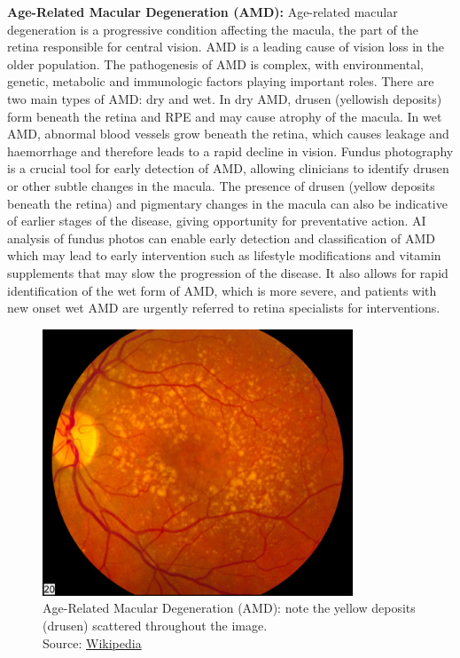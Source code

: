 \documentclass[
  Letterpaper,
]{scrbook}
\begin{document}
\textbf{Age-Related Macular Degeneration (AMD):} Age-related macular
degeneration is a progressive condition affecting the macula, the part
of the retina responsible for central vision. AMD is a leading cause of
vision loss in the older population. The pathogenesis of AMD is complex,
with environmental, genetic, metabolic and immunologic factors playing
important roles. There are two main types of AMD: dry and wet. In dry
AMD, drusen (yellowish deposits) form beneath the retina and RPE and may
cause atrophy of the macula. In wet AMD, abnormal blood vessels grow
beneath the retina, which causes leakage and haemorrhage and therefore
leads to a rapid decline in vision. Fundus photography is a crucial tool
for early detection of AMD, allowing clinicians to identify drusen or
other subtle changes in the macula. The presence of drusen (yellow
deposits beneath the retina) and pigmentary changes in the macula can
also be indicative of earlier stages of the disease, giving opportunity
for preventative action. AI analysis of fundus photos can enable early
detection and classification of AMD which may lead to early intervention
such as lifestyle modifications and vitamin supplements that may slow
the progression of the disease. It also allows for rapid identification
of the wet form of AMD, which is more severe, and patients with new
onset wet AMD are urgently referred to retina specialists for
interventions.

\begin{figure}[H]

{\centering \includegraphics[width=3.64583in,height=\textheight,keepaspectratio]{_resources/images/pathologies/Intermediate_age_related_macular_degeneration.jpg}

}

\caption{Age-Related Macular Degeneration (AMD): note the yellow
deposits (drusen) scattered throughout the image.\\
Source:
\href{https://commons.wikimedia.org/wiki/File:Intermediate_age_related_macular_degeneration.jpg}{Wikipedia}}

\end{figure}%
\end{document}
